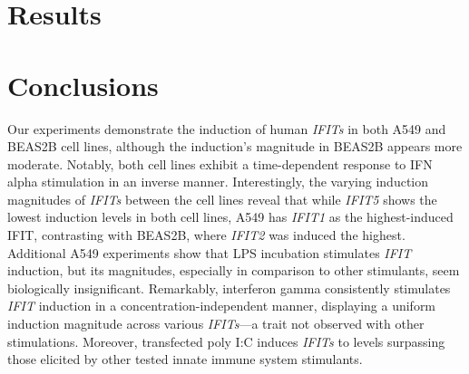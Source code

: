 \section{Results} \label{sec:Results-Chapter 1}


\section{Conclusions} \label{sec:Conclusions Chapter 1}
Our experiments demonstrate the induction of human \textit{IFITs} in both A549 and BEAS2B cell lines, although the induction's magnitude in BEAS2B appears more moderate. Notably, both cell lines exhibit a time-dependent response to IFN alpha stimulation in an inverse manner. Interestingly, the varying induction magnitudes of \textit{IFITs} between the cell lines reveal that while \textit{IFIT5} shows the lowest induction levels in both cell lines, A549 has \textit{IFIT1} as the highest-induced IFIT, contrasting with BEAS2B, where \textit{IFIT2} was induced the highest. Additional A549 experiments show that LPS incubation stimulates \textit{IFIT} induction, but its magnitudes, especially in comparison to other stimulants, seem biologically insignificant. Remarkably, interferon gamma consistently stimulates \textit{IFIT} induction in a concentration-independent manner, displaying a uniform induction magnitude across various \textit{IFITs}—a trait not observed with other stimulations. Moreover, transfected poly I:C induces \textit{IFITs} to levels surpassing those elicited by other tested innate immune system stimulants.

